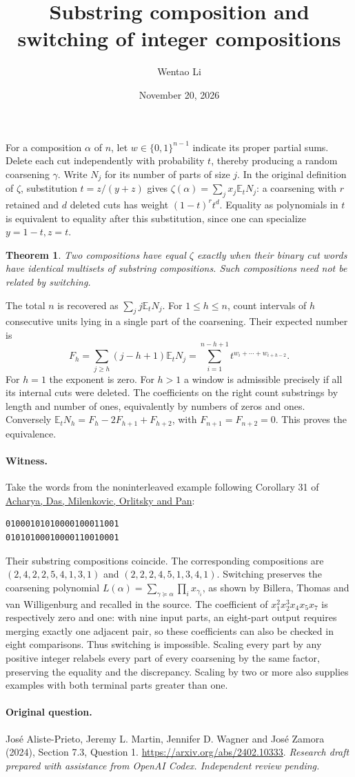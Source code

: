 \documentclass[11pt]{article}
\title{Substring composition and switching of integer compositions}
\author{Wentao Li}
\date{November 20, 2026}
\newtheorem{theorem}{Theorem}
\begin{document}
\maketitle
For a composition $\alpha$ of $n$, let $w\in\{0,1\}^{n-1}$ indicate its proper partial sums. Delete each cut independently with probability $t$, thereby producing a random coarsening $\gamma$. Write $N_j$ for its number of parts of size $j$. In the original definition of $\zeta$, substitution $t=z/(y+z)$ gives $\zeta(\alpha)=\sum_j x_j\mathbb E_t N_j$: a coarsening with $r$ retained and $d$ deleted cuts has weight $(1-t)^rt^d$. Equality as polynomials in $t$ is equivalent to equality after this substitution, since one can specialize $y=1-t,z=t$.
\begin{theorem}Two compositions have equal $\zeta$ exactly when their binary cut words have identical multisets of substring compositions. Such compositions need not be related by switching.\end{theorem}
The total $n$ is recovered as $\sum_j j\mathbb E_tN_j$. For $1\le h\le n$, count intervals of $h$ consecutive units lying in a single part of the coarsening. Their expected number is
\[
 F_h=\sum_{j\ge h}(j-h+1)\mathbb E_tN_j
 =\sum_{i=1}^{n-h+1}t^{w_i+\cdots+w_{i+h-2}} .
\]
For $h=1$ the exponent is zero. For $h>1$ a window is admissible precisely if all its internal cuts were deleted. The coefficients on the right count substrings by length and number of ones, equivalently by numbers of zeros and ones. Conversely $\mathbb E_t N_h=F_h-2F_{h+1}+F_{h+2}$, with $F_{n+1}=F_{n+2}=0$. This proves the equivalence.
\paragraph{Witness.} Take the words from the noninterleaved example following Corollary 31 of \href{https://doi.org/10.1137/140962486}{Acharya, Das, Milenkovic, Orlitsky and Pan}:
\begin{verbatim}
01000101010000100011001
01010100010000110010001
\end{verbatim}
Their substring compositions coincide. The corresponding compositions are
$(2,4,2,2,5,4,1,3,1)$ and $(2,2,2,4,5,1,3,4,1)$. Switching preserves the coarsening polynomial $L(\alpha)=\sum_{\gamma\succeq\alpha}\prod_i x_{\gamma_i}$, as shown by Billera, Thomas and van Willigenburg and recalled in the source. The coefficient of $x_1^2x_2^3x_4x_5x_7$ is respectively zero and one: with nine input parts, an eight-part output requires merging exactly one adjacent pair, so these coefficients can also be checked in eight comparisons. Thus switching is impossible. Scaling every part by any positive integer relabels every part of every coarsening by the same factor, preserving the equality and the discrepancy. Scaling by two or more also supplies examples with both terminal parts greater than one.

\paragraph{Original question.} José Aliste-Prieto, Jeremy L. Martin, Jennifer D. Wagner and José Zamora (2024), Section 7.3, Question 1. \url{https://arxiv.org/abs/2402.10333}.
\medskip\noindent\textit{Research draft prepared with assistance from OpenAI Codex. Independent review pending.}
\end{document}
